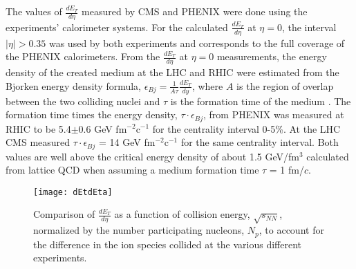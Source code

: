    The values of $\frac{dE_{T}}{d\eta}$ measured by CMS \cite{cmsEt} and PHENIX 
      \cite{phenixDeDeta} were done using the experiments' calorimeter 
      systems.
    For the calculated $\frac{dE_{T}}{d\eta}$ at $\eta = 0$, the interval 
      $|\eta| > 0.35$ was used by both experiments and corresponds to the full
      coverage of the PHENIX calorimeters. 
    From the $\frac{dE_{T}}{d\eta}$ at $\eta = 0$ measurements, the energy 
      density of the created medium at the LHC and RHIC were estimated from the
      Bjorken energy density formula, 
    $\epsilon_{Bj}=\frac{1}{A\tau}\frac{dE_{T}}{dy}$, where $A$ is the region
      of overlap between the two colliding nuclei and $\tau$ is the formation
      time of the medium \cite{bjEdense}.
    The formation time times the energy density, $\tau\cdot\epsilon_{Bj}$, 
      from PHENIX was measured at RHIC to be 5.4$\pm$0.6 GeV fm$^{-2}$c$^{-1}$ 
      for the centrality interval 0-5\%. 
    At the LHC CMS measured $\tau\cdot\epsilon_{Bj}$ = 14 GeV fm$^{-2}$c$^{-1}$ 
      for the same centrality interval.
    Both values are well above the critical energy density of about 1.5 GeV/fm$^{3}$ 
      calculated from lattice QCD when assuming a medium formation time $\tau$ 
      = 1 fm/$c$.
      \begin{figure}[!Hhbt]
        \centering
        \texttt{[image: dEtdEta]}
        \caption{Comparison of $\frac{dE_{T}}{d\eta}$ as a function of 
          collision energy, $\sqrt{s_{NN}}$, normalized by the number 
          participating nucleons, $N_{p}$, to account for the difference in 
          the ion species collided at the various different experiments.}
        \label{fig:dEtdEta}
      \end{figure}

